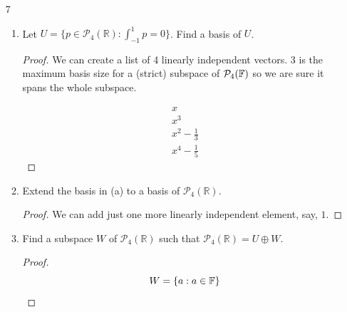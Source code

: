 \begin{enumerate}
\begin{enumerate}
                \begin{proof}
                    We can plop in $x$ now.
                \end{proof}
                \item Find a subspace $W$ of $\mathcal{P}_4(\mathbb{F})$ such that $\mathcal{P}_4(\mathbb{F}) = U \oplus W$.
                
                \begin{proof}
                    That would be $W = \{ax : a \in \F\}$.
                \end{proof}
            \end{enumerate}


            \item[7]
            \begin{enumerate}
                \item Let $U = \{p \in \mathcal{P}_4(\mathbb{R}) : \int_{-1}^{1} p = 0\}$. Find a basis of $U$.
                
                \begin{proof}
                    We can create a list of 4 linearly independent vectors. 3 is the maximum basis size for a (strict) subspace of $\mathcal P_4(\mathbb{F})$ so we are sure it spans the whole subspace.

                    \begin{align*}
                        x \\
                        x^3 \\
                        x^2 - \frac13 \\
                        x^4 - \frac15
                    \end{align*}
                \end{proof}
                \item Extend the basis in (a) to a basis of $\mathcal{P}_4(\mathbb{R})$.
                
                \begin{proof}
                    We can add just one more linearly independent element, say, $1$.
                \end{proof}
                \item Find a subspace $W$ of $\mathcal{P}_4(\mathbb{R})$ such that $\mathcal{P}_4(\mathbb{R}) = U \oplus W$.
                
                \begin{proof}
                    \[W = \{a : a \in \mathbb{F}\}\]
                \end{proof}
            \end{enumerate}


\end{enumerate}
